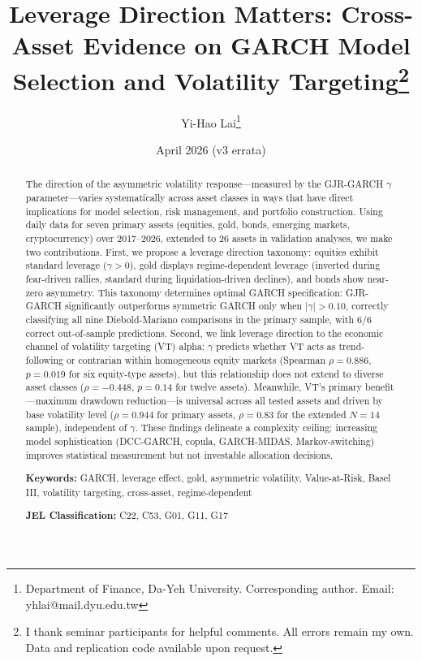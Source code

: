 \documentclass[12pt,a4paper]{article}
\title{Leverage Direction Matters: Cross-Asset Evidence on GARCH Model Selection and Volatility Targeting\thanks{I thank seminar participants for helpful comments. All errors remain my own. Data and replication code available upon request.}}
\author{Yi-Hao Lai\thanks{Department of Finance, Da-Yeh University. Corresponding author. Email: yhlai@mail.dyu.edu.tw}}
\date{April 2026 (v3 errata)}
\begin{document}
\maketitle

\begin{abstract}
\noindent
The direction of the asymmetric volatility response---measured by the GJR-GARCH $\gamma$ parameter---varies systematically across asset classes in ways that have direct implications for model selection, risk management, and portfolio construction. Using daily data for seven primary assets (equities, gold, bonds, emerging markets, cryptocurrency) over 2017--2026, extended to 26 assets in validation analyses, we make two contributions. First, we propose a leverage direction taxonomy: equities exhibit standard leverage ($\gamma > 0$), gold displays regime-dependent leverage (inverted during fear-driven rallies, standard during liquidation-driven declines), and bonds show near-zero asymmetry. This taxonomy determines optimal GARCH specification: GJR-GARCH significantly outperforms symmetric GARCH only when $|\gamma| > 0.10$, correctly classifying all nine Diebold-Mariano comparisons in the primary sample, with 6/6 correct out-of-sample predictions. Second, we link leverage direction to the economic channel of volatility targeting (VT) alpha: $\gamma$ predicts whether VT acts as trend-following or contrarian within homogeneous equity markets (Spearman $\rho = 0.886$, $p = 0.019$ for six equity-type assets), but this relationship does not extend to diverse asset classes ($\rho = -0.448$, $p = 0.14$ for twelve assets). Meanwhile, VT's primary benefit---maximum drawdown reduction---is universal across all tested assets and driven by base volatility level ($\rho = 0.944$ for primary assets, $\rho = 0.83$ for the extended $N = 14$ sample), independent of $\gamma$. These findings delineate a complexity ceiling: increasing model sophistication (DCC-GARCH, copula, GARCH-MIDAS, Markov-switching) improves statistical measurement but not investable allocation decisions.

\medskip
\noindent
\textbf{Keywords:} GARCH, leverage effect, gold, asymmetric volatility, Value-at-Risk, Basel III, volatility targeting, cross-asset, regime-dependent

\medskip
\noindent
\textbf{JEL Classification:} C22, C53, G01, G11, G17
\end{abstract}
\end{document}
